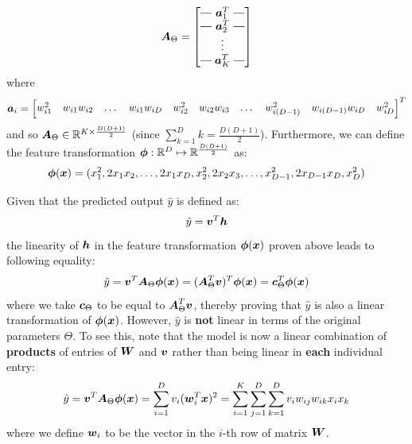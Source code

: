 \documentclass{exam}
\makeatletter
\newcommand{\brows}[1]{%
  \begin{bmatrix}
  \begin{array}{@{\protect\rotvert\;}c@{\;\protect\rotvert}}
  #1
  \end{array}
  \end{bmatrix}
}
\newcommand{\rotvert}{\rotatebox[origin=c]{90}{$\vert$}}
\newcommand{\rowsvdots}{\multicolumn{1}{@{}c@{}}{\vdots}}
\makeatother
\begin{document}
\begin{questions}
        \begin{equation*}
            \vb*{A}_{\Theta} = 
            \brows{\vb*{a}_1^T \\ \vb*{a}_2^T \\ \rowsvdots \\ \vb*{a}_K^T}
        \end{equation*}
        where
        \begin{equation*}
            \vb*{a}_i = 
            \begin{bmatrix}
            w_{i1}^2 & w_{i1}w_{i2} & \dots & w_{i1}w_{iD} & w_{i2}^2 & w_{i2}w_{i3} & \dots & w_{i(D - 1)}^2  & w_{i(D - 1)} w_{iD} &  w_{iD}^2
            \end{bmatrix}^T
        \end{equation*}
        and so $\vb*{A}_{\Theta} \in \mathbb{R}^{K \times \frac{D(D + 1)}{2}}$ (since $\sum_{k = 1}^{D} k = \frac{D(D + 1)}{2}$). Furthermore, we can define the feature transformation $\vb*{\phi} : \mathbb{R}^D \mapsto  \mathbb{R}^{\frac{D(D + 1)}{2}}$ as:
        \begin{equation*}
            \vb*{\phi}(\vb*{x}) = (x_1^2, 2x_1 x_2, \dots, 2x_1 x_D, x_2^2, 2x_2 x_3, \dots, x_{D - 1}^2, 2x_{D - 1} x_{D}, x_{D}^2)
        \end{equation*}

        \question
        Given that the predicted output $\hat{y}$ is defined as:
        \[
            \hat{y} = \vb*{v}^T \vb*{h}
        \]
        the linearity of $\vb*{h}$ in the feature transformation $\vb*{\phi}(\vb*{x})$ proven above leads to following equality:
        \[
            \hat{y} = \vb*{v}^T \vb*{A}_{\Theta} \vb*{\phi}(\vb*{x}) 
                    = (\vb*{A}_{\Theta}^T \vb*{v})^T \vb*{\phi}(\vb*{x}) 
                    = \vb*{c}_{\Theta}^T \vb*{\phi}(\vb*{x}) 
        \]
        where we take $\vb*{c}_{\Theta}$ to be equal to $\vb*{A}_{\Theta}^T \vb*{v}$, thereby proving that $\hat{y}$ is also a linear transformation of $\vb*{\phi}(\vb*{x})$. However, $\hat{y}$ is \textbf{not} linear in terms of the original parameters $\Theta$. To see this, note that the model is now a linear combination of \textbf{products} of entries of $\vb*{W}$ and $\vb*{v}$ rather than being linear in \textbf{each} individual entry:
        \[
            \hat{y} = \vb*{v}^T \vb*{A}_{\Theta} \vb*{\phi}(\vb*{x}) = \sum_{i = 1}^{D} v_i (\vb*{w}_i^T \vb*{x})^2 
            = \sum_{i = 1}^{K} \sum_{j = 1}^{D} \sum_{k = 1}^{D} v_i w_{ij} w_{ik} x_i x_k
        \]
        where we define $\vb*{w}_i$ to be the vector in the $i$-th row of matrix $\vb*{W}$.


\end{questions}
\end{document}

